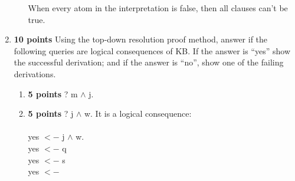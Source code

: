 \documentclass{article}
\def\ans#1{{\color{ans}#1}}
\begin{document}
\begin{enumerate}[label=(\alph*)]
\begin{enumerate}[label=\roman*.]
                \ans{
          When every atom in the interpretation is false, then all clauses can't be true.
      }  \\
        
    \end{enumerate}
    \item \textbf{10 points} Using the top-down resolution proof method, answer if the following queries are logical consequences of KB. If the answer is “yes” show the successful derivation; and if the answer is “no”, show one of the failing derivations.
    \begin{enumerate}[label=\roman*.]
        \item \textbf{5 points} ? m $\wedge$ j.
        \item \textbf{5 points} ? j $\wedge$ w.
        \ans{
          It is a logical consequence: \\ \\
          yes $<-$ j $\wedge$ w. \\
          yes $<-$ q \\
          yes $<-$ s \\
          yes $<-$ 
      }  \\
    \end{enumerate}
\end{enumerate}

\clearpage
\end{document}
